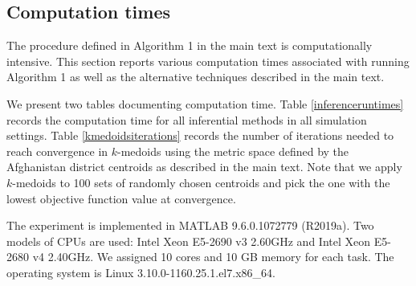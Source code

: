 \documentclass[preprint]{imsart}
\numberwithin{equation}{section}
\theoremstyle{plain}
\theoremstyle{definition}
\renewcommand{\(}{\left(}
\renewcommand{\)}{\right)}
\renewcommand{\[}{\left[}
\renewcommand{\]}{\right]}
\begin{document}
{\begin{landscape}
	
\end{landscape}


\subsection{Computation times}
\label{computation:times}
The procedure defined in Algorithm 1 in the main text is computationally intensive.  This section reports various computation times associated with running Algorithm 1 as well as the alternative techniques described in the main text.  


We present two tables documenting computation time.  Table \ref{inferenceruntimes} records the computation time for all inferential methods in all simulation settings.   Table \ref{kmedoidsiterations} records the number of iterations needed to reach convergence in $k$-medoids using the metric space defined by the Afghanistan district centroids as described in the main text. Note that we apply $k$-medoids to 100 sets of randomly chosen centroids and pick the one with the lowest objective function value at convergence. 


The experiment is implemented in MATLAB 9.6.0.1072779 (R2019a). 
Two models of CPUs are used: Intel Xeon E5-2690 v3 2.60GHz and Intel Xeon E5-2680 v4 2.40GHz.
We assigned 10 cores and 10 GB memory for each task.
The operating system is Linux 3.10.0-1160.25.1.el7.x86\_64.


}
\end{document}
